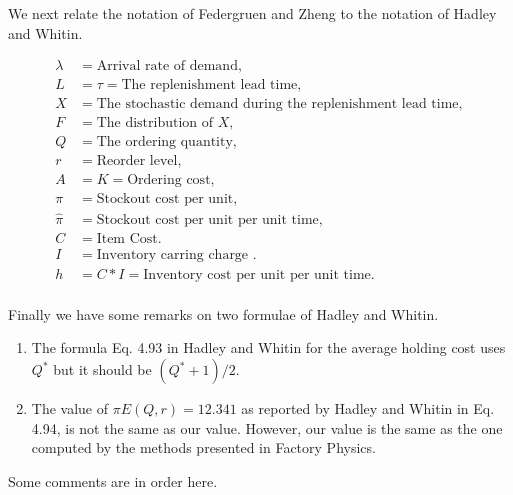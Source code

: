 \documentclass{article}
\newcommand{\1}[1]{\mathbb{1}_{#1}}
\begin{document}
We next relate the notation of Federgruen and Zheng to the
notation of Hadley and Whitin.

   \begin{align*}
     \lambda &= \text{Arrival rate of demand}, \\
     L &= \tau = \text{The replenishment lead time}, \\
     X &= \text{The stochastic demand during the replenishment lead time}, \\
     F &= \text{The distribution of } X,\\
     Q &= \text{The ordering quantity}, \\
     r &= \text{Reorder level}, \\
     A & = K = \text{Ordering cost},\\
     \pi & = \text{Stockout cost per unit},\\
     \hat \pi & = \text{Stockout cost per unit per unit time},\\
     C &= \text{Item Cost}. \\
     I &= \text{Inventory carring charge }. \\
     h &= C*I = \text{Inventory cost per unit per unit time}. \\
   \end{align*}


Finally we have some remarks on two formulae of Hadley and Whitin.
\begin{enumerate}
\item The formula Eq. 4.93 in Hadley and Whitin for the average
  holding cost uses $Q^*$ but it should be $(Q^*+1)/2$. 
\item The value of $\pi E(Q,r) = 12.341$ as reported by Hadley and
  Whitin in Eq. 4.94, is not the same as our value. However, our value
  is the same as the one computed by the methods presented in Factory
  Physics.
\end{enumerate}

Some comments are in order here.
\end{document}
